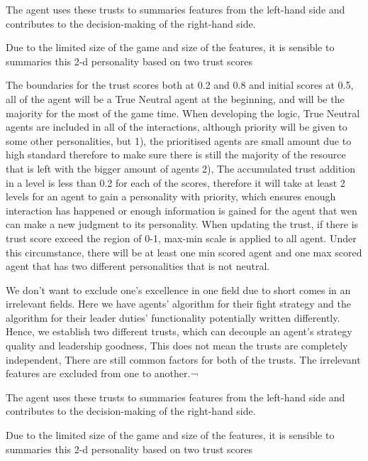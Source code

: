 The agent uses these trusts to summaries features from the left-hand side and contributes to the decision-making of the right-hand side. 

Due to the limited size of the game and size of the features, it is sensible to summaries this 2-d personality based on two trust scores

The boundaries for the trust scores both at 0.2 and 0.8 and initial scores at 0.5, all of the agent will be a True Neutral agent at the beginning, and will be the majority for the most of the game time. When developing the logic, True Neutral agents are included in all of the interactions, although priority will be given to some other personalities, but 1), the prioritised agents are small amount due to high standard therefore to make sure there is still the majority of the resource that is left with the bigger amount of agents 2), The accumulated trust addition in a level is less than 0.2 for each of the scores, therefore it will take at least 2 levels for an agent to gain a personality with priority, which ensures enough interaction has happened or enough information is gained for the agent that wen can make a new judgment to its personality. When updating the trust, if there is trust score exceed the region of 0-1, max-min scale is applied to all agent. Under this circumstance, there will be at least one min scored agent and one max scored agent that has two different personalities that is not neutral. 

We don’t want to exclude one’s excellence in one field due to short comes in an irrelevant fields.
Here we have agents’ algorithm for their fight strategy and the algorithm for their leader duties’ functionality potentially written differently. 
Hence, we establish two different trusts, which can decouple an agent’s strategy quality and leadership goodness, 
This does not mean the trusts are completely independent, 
There are still common factors for both of the trusts.
The irrelevant features are excluded from one to another.¬

The agent uses these trusts to summaries features from the left-hand side and contributes to the decision-making of the right-hand side. 

Due to the limited size of the game and size of the features, it is sensible to summaries this 2-d personality based on two trust scores

